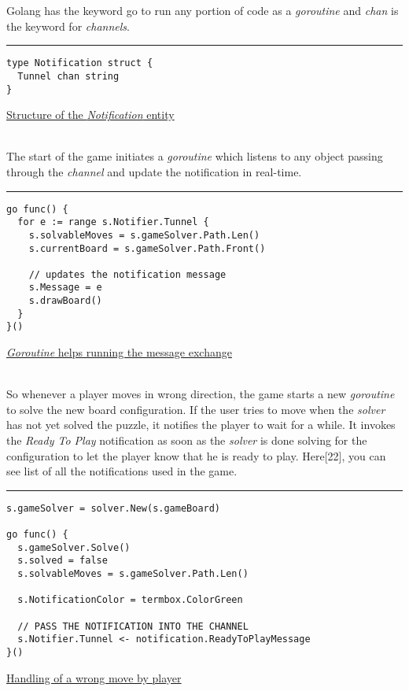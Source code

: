\documentclass[a4paper]{article}
\begin{document}
\textrm{\normalsize{Golang has the keyword go to run any portion of code as a \textit{goroutine} and \textit{chan} is the keyword for
\textit{channels}.\\}}

\rule{\textwidth}{1pt}
\begin{verbatim}
type Notification struct {
  Tunnel chan string
}
\end{verbatim}
\underline{Structure of the \textit{Notification} entity}

\textrm{\normalsize{\\The start of the game initiates a \textit{goroutine} which listens to any object passing through the \textit{channel}
and update the notification in real-time.\\}}

\rule{\textwidth}{1pt}
\begin{verbatim}
go func() {
  for e := range s.Notifier.Tunnel {
    s.solvableMoves = s.gameSolver.Path.Len()
    s.currentBoard = s.gameSolver.Path.Front()

    // updates the notification message
    s.Message = e
    s.drawBoard()
  }
}()
\end{verbatim}
\underline{\textit{Goroutine} helps running the message exchange}

\textrm{\normalsize{\\So whenever a player moves in wrong direction, the game starts a new \textit{goroutine} to solve the new
board configuration. If the user tries to move when the \textit{solver} has not yet solved the puzzle, it
notifies the player to wait for a while. It invokes the \textit{Ready To Play} notification as soon as the
\textit{solver} is done solving for the configuration to let the player know that he is ready to play. Here[22],
you can see list of all the notifications used in the game.\\}}

\rule{\textwidth}{1pt}
\begin{verbatim}
s.gameSolver = solver.New(s.gameBoard)

go func() {
  s.gameSolver.Solve()
  s.solved = false
  s.solvableMoves = s.gameSolver.Path.Len()

  s.NotificationColor = termbox.ColorGreen

  // PASS THE NOTIFICATION INTO THE CHANNEL
  s.Notifier.Tunnel <- notification.ReadyToPlayMessage
}()
\end{verbatim}
\underline{Handling of a wrong move by player}
\end{document}
